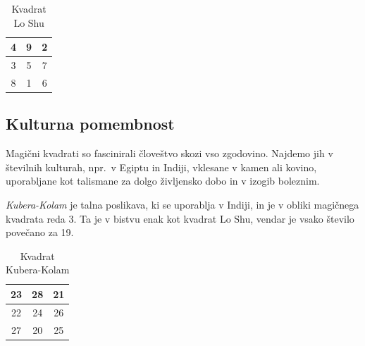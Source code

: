 \documentclass[a4paper,12pt]{article}
\begin{document}
\begin{table}[h!]
   \centering
   \caption{Kvadrat Lo Shu}
   \label{table:loshu}
   \begin{tabular}{|c|c|c|}
      \hline
      4 & 9 & 2 \\\hline
      3 & 5 & 7 \\\hline
      8 & 1 & 6 \\\hline
      
   \end{tabular}
\end{table}


\subsection{Kulturna pomembnost}

Magični kvadrati so fascinirali človeštvo skozi vso zgodovino. Najdemo jih
v številnih kulturah, npr.\ v Egiptu in Indiji, vklesane v kamen ali
kovino, uporabljane kot talismane za dolgo življensko dobo in v
izogib boleznim.

\emph{Kubera-Kolam} je talna poslikava, ki se uporablja v Indiji, in je v
obliki magičnega kvadrata reda 3. Ta je v bistvu enak kot kvadrat
Lo Shu, vendar je vsako število povečano za 19.

\begin{table}[h!]
   \centering
   \caption{Kvadrat Kubera-Kolam}
   \label{table:kubera}
   \begin{tabular}{|c|c|c|}
      \hline
      23 & 28 & 21 \\\hline
      22 & 24 & 26 \\\hline
      27 & 20 & 25 \\\hline
      
   \end{tabular}
\end{table}
\end{document}
